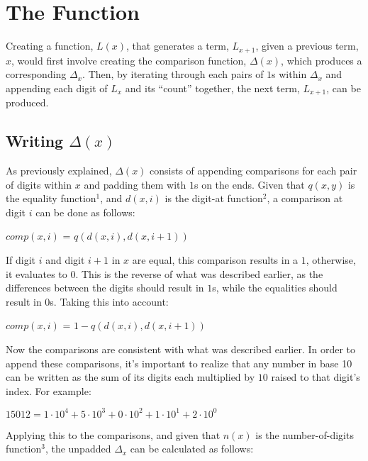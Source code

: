 \documentclass{article}
\begin{document}
	\section{The Function}
	Creating a function, $L(x)$, that generates a term, $L_{x + 1}$, given a previous term, $x$, 
	would first involve creating the comparison function, $\Delta(x)$, which produces a 
	corresponding $\Delta_x$. Then, by iterating through each pairs of $1$s within $\Delta_x$ and 
	appending each digit of $L_x$ and its ``count'' together, the next term, $L_{x+1}$, can be 
	produced.

		\subsection{Writing $\Delta(x)$}
		As previously explained, $\Delta(x)$ consists of appending comparisons for each pair of 
		digits within $x$ and padding them with $1$s on the ends. Given that $q(x, y)$ is the 
		equality function$^1$, and $d(x, i)$ is the digit-at function$^2$, a comparison at digit $i$
		can be done as follows:

		\begin{center}
		$comp(x, i)$ = $q(d(x, i), d(x, i + 1))$
		\end{center}

		\noindent If digit $i$ and digit $i + 1$ in $x$ are equal, this comparison results in a $1$, 
		otherwise, it evaluates to $0$. This is the reverse of what was described earlier, as the 
		differences between the digits should result in $1$s, while the equalities should result 
		in $0$s. Taking this into account:

		\begin{center}
		$comp(x, i)$ = $1 - q(d(x, i), d(x, i + 1))$
		\end{center}

		\noindent Now the comparisons are consistent with what was described earlier. In order to 
		append these comparisons, it's important to realize that any number in base 10 can be 
		written as the sum of its digits each multiplied by $10$ raised to that digit's index. For 
		example:

		\begin{center}
		$15012 = 1 \cdot 10^{4} + 5 \cdot 10^{3} + 0 \cdot 10^{2} + 1 \cdot 10^{1} + 2 \cdot 10^{0}$
		\end{center}

		\noindent Applying this to the comparisons, and given that $n(x)$ is the number-of-digits 
		function$^3$, the unpadded $\Delta_{x}$ can be calculated as follows:
\end{document}
